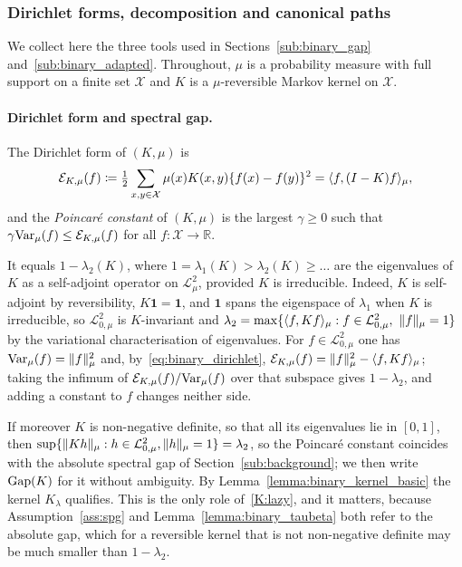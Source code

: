 \documentclass[aos]{imsart}%
\DeclarePairedDelimiter{\norm}{\lVert}{\rVert}
\newcommand{\ambientspace}[0]{\mathcal{X}}
\newcommand{\bbR}[0]{\mathbb{R}}
\newcommand{\calL}[0]{\mathcal{L}}
\newcommand{\Var}{\mathrm{Var}}
\theoremstyle{plain}
\theoremstyle{definition}
\begin{document}
    \subsubsection{Dirichlet forms, decomposition and canonical paths}
    \label{sub:binary_tools}

    We collect here the three tools used in
    Sections~\ref{sub:binary_gap} and~\ref{sub:binary_adapted}. Throughout,
    $\mu$ is a probability measure with full support on a finite set
    $\ambientspace$ and $K$ is a $\mu$-reversible Markov kernel on
    $\ambientspace$.

    \paragraph{Dirichlet form and spectral gap.}
    The Dirichlet form of $(K,\mu)$ is
    \begin{equation}
        \label{eq:binary_dirichlet}
        \Dir_{K,\mu}(f)\coloneq\tfrac12\sum_{x,y\in\ambientspace}
        \mu(x)K(x,y)\{f(x)-f(y)\}^{2}
        =\langle f,(I-K)f\rangle_\mu ,
    \end{equation}
    and the \emph{Poincar\'e constant} of $(K,\mu)$ is the largest
    $\gamma\geq0$ such that $\gamma\Var_\mu(f)\leq\Dir_{K,\mu}(f)$ for all
    $f:\ambientspace\to\bbR$.

    It equals $1-\lambda_2(K)$, where $1=\lambda_1(K)>\lambda_2(K)\geq\dots$
    are the eigenvalues of $K$ as a self-adjoint operator on
    $\calL^{2}_{\mu}$, provided $K$ is irreducible. Indeed, $K$ is self-adjoint
    by reversibility, $K\mathbf1=\mathbf1$, and $\mathbf1$ spans the eigenspace
    of $\lambda_1$ when $K$ is irreducible, so $\calL^{2}_{0,\mu}$ is
    $K$-invariant and $\lambda_2=\max\{\langle f,Kf\rangle_\mu:f\in
    \calL^{2}_{0,\mu},\ \norm f_\mu=1\}$ by the variational characterisation of
    eigenvalues. For $f\in\calL^{2}_{0,\mu}$ one has $\Var_\mu(f)=\norm
    f_\mu^{2}$ and, by~\eqref{eq:binary_dirichlet},
    $\Dir_{K,\mu}(f)=\norm f_\mu^{2}-\langle f,Kf\rangle_\mu$; taking the
    infimum of $\Dir_{K,\mu}(f)/\Var_\mu(f)$ over that subspace gives
    $1-\lambda_2$, and adding a constant to $f$ changes neither side.

    If moreover $K$ is non-negative definite, so that all its eigenvalues lie
    in $[0,1]$, then $\sup\{\norm{Kh}_\mu:h\in\calL^{2}_{0,\mu},\norm
    h_\mu=1\}=\lambda_2$, so the Poincar\'e constant coincides with the
    absolute spectral gap of Section~\ref{sub:background}; we then write
    $\mathrm{Gap}(K)$ for it without ambiguity. By
    Lemma~\ref{lemma:binary_kernel_basic} the kernel $K_\lambda$ qualifies.
    This is the only role of~\ref{K:lazy}, and it matters, because
    Assumption~\ref{ass:spg} and Lemma~\ref{lemma:binary_taubeta} both refer to
    the absolute gap, which for a reversible kernel that is not non-negative
    definite may be much smaller than $1-\lambda_2$.
\end{document}
